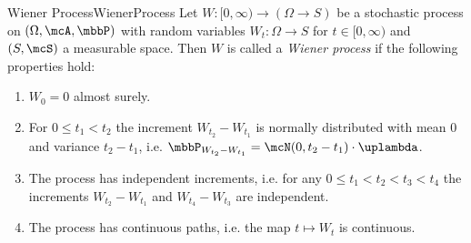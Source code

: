\begin{mdef}{Wiener Process}{WienerProcess}
    Let $W:[0,\infty)\to(\Omega\to S)$ be a stochastic process on $(\Omega,\mcA,\mbbP)$ with random variables $W_t:\Omega\to S$ for $t\in[0,\infty)$ and $(S,\mcS)$ a measurable space. Then $W$ is called a \emph{Wiener process} if the following properties hold:
    \begin{enumerate}
        \item $W_0 = 0$ almost surely.
        \item For $0\leq t_1 < t_2$ the increment $W_{t_2} - W_{t_1}$ is normally distributed with mean $0$ and variance $t_2 - t_1$, i.e. $\mbbP_{W_{t_2} - W_{t_1}} = \mcN(0,t_2 - t_1)\cdot\uplambda$. 
        \item The process has independent increments, i.e. for any $0\leq t_1 < t_2 < t_3 < t_4$ the increments $W_{t_2} - W_{t_1}$ and $W_{t_4} - W_{t_3}$ are independent.
        \item The process has continuous paths, i.e. the map $t\mapsto W_t$ is continuous.
    \end{enumerate}
\end{mdef}